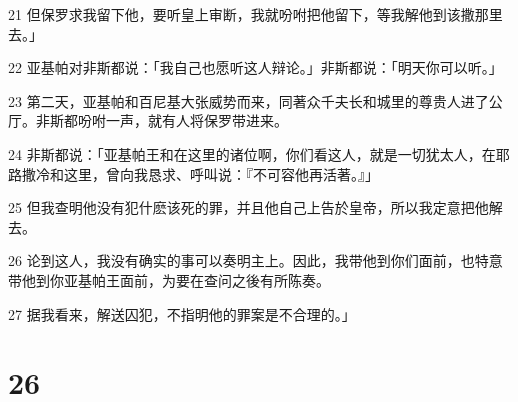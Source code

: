 \par 21 但保罗求我留下他，要听皇上审断，我就吩咐把他留下，等我解他到该撒那里去。」
\par 22 亚基帕对非斯都说：「我自己也愿听这人辩论。」非斯都说：「明天你可以听。」
\par 23 第二天，亚基帕和百尼基大张威势而来，同著众千夫长和城里的尊贵人进了公厅。非斯都吩咐一声，就有人将保罗带进来。
\par 24 非斯都说：「亚基帕王和在这里的诸位啊，你们看这人，就是一切犹太人，在耶路撒冷和这里，曾向我恳求、呼叫说：『不可容他再活著。』」
\par 25 但我查明他没有犯什麽该死的罪，并且他自己上告於皇帝，所以我定意把他解去。
\par 26 论到这人，我没有确实的事可以奏明主上。因此，我带他到你们面前，也特意带他到你亚基帕王面前，为要在查问之後有所陈奏。
\par 27 据我看来，解送囚犯，不指明他的罪案是不合理的。」

\chapter{26}

